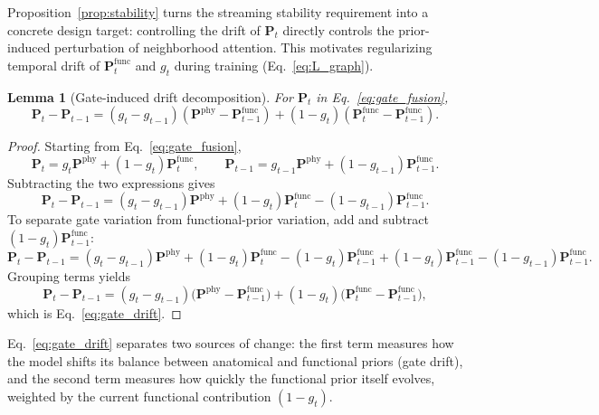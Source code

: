 \documentclass[preprint,12pt]{elsarticle}
\newtheorem{lemma}{Lemma}
\newtheorem{proof}{Proof}
\begin{document}
Proposition~\ref{prop:stability} turns the streaming stability requirement into a concrete design target:
controlling the drift of $\mathbf{P}_t$ directly controls the prior-induced perturbation of neighborhood attention.
This motivates regularizing temporal drift of $\mathbf{P}^{\mathrm{func}}_t$ and $g_t$ during training (Eq.~\eqref{eq:L_graph}).

\begin{lemma}[Gate-induced drift decomposition]
\label{lem:gate_drift}
For $\mathbf{P}_t$ in Eq.~\eqref{eq:gate_fusion},
\begin{equation}
\mathbf{P}_t-\mathbf{P}_{t-1}
=
(g_t-g_{t-1})(\mathbf{P}^{\mathrm{phy}}-\mathbf{P}^{\mathrm{func}}_{t-1})
+
(1-g_t)(\mathbf{P}^{\mathrm{func}}_{t}-\mathbf{P}^{\mathrm{func}}_{t-1}).
\label{eq:gate_drift}
\end{equation}
\end{lemma}

\begin{proof}
Starting from Eq.~\eqref{eq:gate_fusion},
\[
\mathbf{P}_t
=
g_t\mathbf{P}^{\mathrm{phy}}+(1-g_t)\mathbf{P}^{\mathrm{func}}_t,
\qquad
\mathbf{P}_{t-1}
=
g_{t-1}\mathbf{P}^{\mathrm{phy}}+(1-g_{t-1})\mathbf{P}^{\mathrm{func}}_{t-1}.
\]
Subtracting the two expressions gives
\[
\mathbf{P}_t-\mathbf{P}_{t-1}
=
(g_t-g_{t-1})\mathbf{P}^{\mathrm{phy}}
+
(1-g_t)\mathbf{P}^{\mathrm{func}}_t
-
(1-g_{t-1})\mathbf{P}^{\mathrm{func}}_{t-1}.
\]
To separate gate variation from functional-prior variation, add and subtract
$(1-g_t)\mathbf{P}^{\mathrm{func}}_{t-1}$:
\[
\mathbf{P}_t-\mathbf{P}_{t-1}
=
(g_t-g_{t-1})\mathbf{P}^{\mathrm{phy}}
+
(1-g_t)\mathbf{P}^{\mathrm{func}}_t
-
(1-g_t)\mathbf{P}^{\mathrm{func}}_{t-1}
+
(1-g_t)\mathbf{P}^{\mathrm{func}}_{t-1}
-
(1-g_{t-1})\mathbf{P}^{\mathrm{func}}_{t-1}.
\]
Grouping terms yields
\[
\mathbf{P}_t-\mathbf{P}_{t-1}
=
(g_t-g_{t-1})\bigl(\mathbf{P}^{\mathrm{phy}}-\mathbf{P}^{\mathrm{func}}_{t-1}\bigr)
+
(1-g_t)\bigl(\mathbf{P}^{\mathrm{func}}_{t}-\mathbf{P}^{\mathrm{func}}_{t-1}\bigr),
\]
which is Eq.~\eqref{eq:gate_drift}.
\end{proof}

Eq.~\eqref{eq:gate_drift} separates two sources of change:
the first term measures how the model shifts its balance between anatomical and functional priors (gate drift),
and the second term measures how quickly the functional prior itself evolves,
weighted by the current functional contribution $(1-g_t)$.
\end{document}
